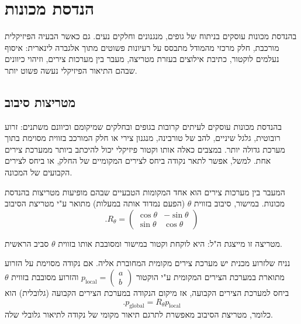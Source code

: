 \documentclass[12pt]{report}
\theoremstyle{plain}
\theoremstyle{definition}
\newcommand{\0}{\mathbf{0}}
\begin{document}
\section{הנדסת מכונות}

בהנדסת מכונות עוסקים בניתוח של גופים, מנגנונים וחלקים נעים.
גם כאשר הבעיה הפיזיקלית מורכבת, חלק מרכזי מהמודל מתבסס על רעיונות פשוטים מתוך אלגברה לינארית:
איסוף נעלמים לוקטור, כתיבת אילוצים בעזרת מטריצה, מעבר בין מערכות צירים, וזיהוי כיוונים שבהם התיאור הפיזיקלי נעשה פשוט יותר.

\subsection*{מטריצות סיבוב }

בהנדסת מכונות עוסקים לעיתים קרובות בגופים ובחלקים שמיקומם וכיוונם משתנים:
זרוע רובוטית, גלגל שיניים, להב של טורבינה, מנגנון צירי או חלק המורכב בזווית מסוימת בתוך מערכת גדולה יותר.
במצבים כאלה אותו וקטור פיזיקלי יכול להיכתב ביותר ממערכת צירים אחת.
למשל, אפשר לתאר נקודה ביחס לצירים המקומיים של החלק, או ביחס לצירים הקבועים של המכונה.

המעבר בין מערכות צירים הוא אחד המקומות הטבעיים שבהם מופיעות מטריצות בהנדסת מכונות.
במישור, סיבוב בזווית
$
\theta
$
(הפעם נמדוד אותה במעלות)
מתואר ע"י מטריצת הסיבוב
$$
.R_\theta =
\begin{pmatrix}
\cos\theta & -\sin\theta \\
\sin\theta & \cos\theta
\end{pmatrix}
$$

מטריצה זו מייצגת ה"ל: היא לוקחת וקטור במישור ומסובבת אותו בזווית
$\theta$
סביב הראשית.

נניח שלזרוע מכנית יש מערכת צירים מקומית המחוברת אליה.
אם נקודה מסוימת על הזרוע מתוארת במערכת הצירים המקומית ע"י הוקטור
$
p_{\mathrm{local}}
=
\begin{pmatrix}
a \\
b
\end{pmatrix}
$
והזרוע מסובבת בזווית
$\theta$
ביחס למערכת הצירים הקבועה, אז מיקום הנקודה במערכת הצירים הקבועה (גלובלית) הוא
$$
.p_{\mathrm{global}} = R_\theta p_{\mathrm{local}}
$$
כלומר, מטריצת הסיבוב מאפשרת לתרגם תיאור מקומי של נקודה לתיאור גלובלי שלה.
\end{document}
